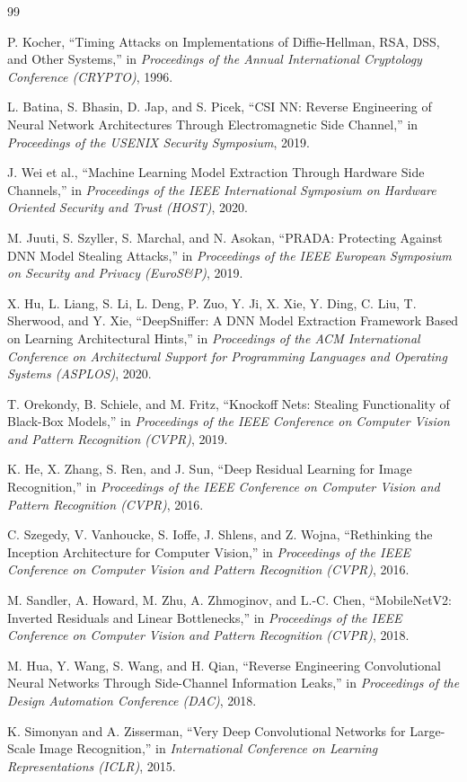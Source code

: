 \documentclass[conference]{IEEEtran}
\begin{document}
\begin{thebibliography}{99}

P. Kocher, ``Timing Attacks on Implementations of Diffie-Hellman, RSA,
DSS, and Other Systems,'' in \textit{Proceedings of the Annual International
Cryptology Conference (CRYPTO)}, 1996.

L. Batina, S. Bhasin, D. Jap, and S. Picek, ``CSI NN: Reverse Engineering
of Neural Network Architectures Through Electromagnetic Side Channel,''
in \textit{Proceedings of the USENIX Security Symposium}, 2019.

J. Wei et al., ``Machine Learning Model Extraction Through Hardware Side
Channels,'' in \textit{Proceedings of the IEEE International Symposium on
Hardware Oriented Security and Trust (HOST)}, 2020.

M. Juuti, S. Szyller, S. Marchal, and N. Asokan, ``PRADA: Protecting
Against DNN Model Stealing Attacks,'' in \textit{Proceedings of the IEEE
European Symposium on Security and Privacy (EuroS\&P)}, 2019.

X. Hu, L. Liang, S. Li, L. Deng, P. Zuo, Y. Ji, X. Xie, Y. Ding,
C. Liu, T. Sherwood, and Y. Xie, ``DeepSniffer: A DNN Model Extraction
Framework Based on Learning Architectural Hints,'' in
\textit{Proceedings of the ACM International Conference on Architectural
Support for Programming Languages and Operating Systems (ASPLOS)}, 2020.

T. Orekondy, B. Schiele, and M. Fritz, ``Knockoff Nets: Stealing
Functionality of Black-Box Models,'' in \textit{Proceedings of the IEEE
Conference on Computer Vision and Pattern Recognition (CVPR)}, 2019.

K. He, X. Zhang, S. Ren, and J. Sun, ``Deep Residual Learning for Image
Recognition,'' in \textit{Proceedings of the IEEE Conference on Computer
Vision and Pattern Recognition (CVPR)}, 2016.

C. Szegedy, V. Vanhoucke, S. Ioffe, J. Shlens, and Z. Wojna,
``Rethinking the Inception Architecture for Computer Vision,'' in
\textit{Proceedings of the IEEE Conference on Computer Vision and Pattern
Recognition (CVPR)}, 2016.

M. Sandler, A. Howard, M. Zhu, A. Zhmoginov, and L.-C. Chen,
``MobileNetV2: Inverted Residuals and Linear Bottlenecks,'' in
\textit{Proceedings of the IEEE Conference on Computer Vision and Pattern
Recognition (CVPR)}, 2018.

M. Hua, Y. Wang, S. Wang, and H. Qian,
``Reverse Engineering Convolutional Neural Networks Through Side-Channel
Information Leaks,'' in \textit{Proceedings of the Design Automation
Conference (DAC)}, 2018.

K. Simonyan and A. Zisserman,
``Very Deep Convolutional Networks for Large-Scale Image Recognition,''
in \textit{International Conference on Learning Representations (ICLR)}, 2015.



\end{thebibliography}
\end{document}
